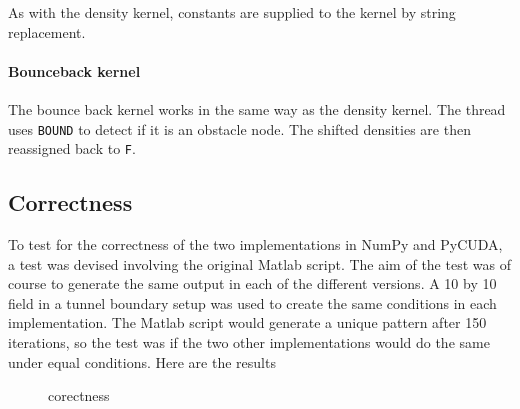 As with the density kernel, constants are supplied to the kernel by string replacement.


\paragraph{Bounceback kernel}
The bounce back kernel works in the same way as the density kernel. The thread uses \texttt{BOUND} to detect if it is an obstacle node. The shifted densities are then reassigned back to \texttt{F}.



\subsection{Correctness}
To test for the correctness of the two implementations in NumPy and PyCUDA, a test was devised involving the original Matlab script. The aim of the test was of course to generate the same output in each of the different versions. A 10 by 10 field in a tunnel boundary setup was used to create the same conditions in each implementation. The Matlab script would generate a unique pattern after 150 iterations, so the test was if the two other implementations would do the same under equal conditions. Here are the results

\begin{figure}[H]
\centering
{}
\hspace{1pt}
\caption{corectness}
\label{correctness}
\end{figure}


